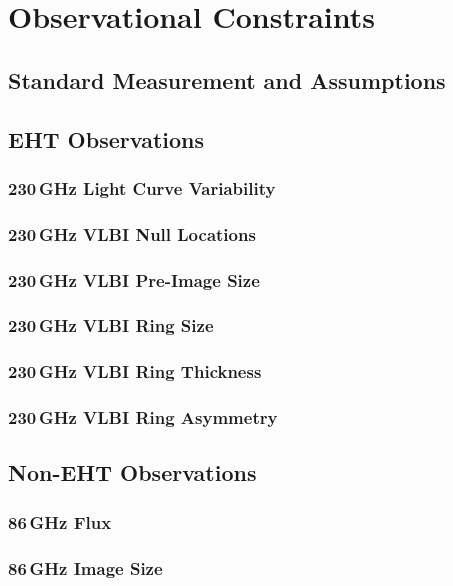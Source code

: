 \documentclass[twocolumn,twocolappendix,tighten,dvipsnames,linenumbers]{aastex63}
\begin{document}
\clearpage

\section{Observational Constraints}

\subsection{Standard Measurement and Assumptions}

\subsection{EHT Observations}
\subsubsection{230\,GHz Light Curve Variability}
\subsubsection{230\,GHz VLBI Null Locations}
\subsubsection{230\,GHz VLBI Pre-Image Size}
\subsubsection{230\,GHz VLBI Ring Size}
\subsubsection{230\,GHz VLBI Ring Thickness}
\subsubsection{230\,GHz VLBI Ring Asymmetry}

\subsection{Non-EHT Observations}
\subsubsection{86\,GHz Flux}
\subsubsection{86\,GHz Image Size}
\end{document}

